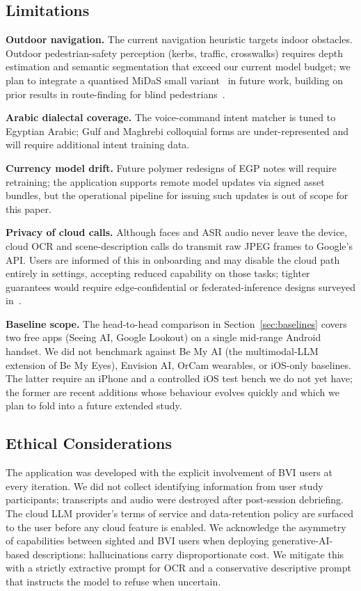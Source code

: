 \documentclass[11pt,a4paper]{article}
\begin{document}


\subsection{Limitations}

\textbf{Outdoor navigation.} The current navigation heuristic targets
indoor obstacles. Outdoor pedestrian-safety perception (kerbs, traffic,
crosswalks) requires depth estimation and semantic segmentation that
exceed our current model budget; we plan to integrate a quantised MiDaS
small variant~\cite{midas_depth} in future work, building on prior
results in route-finding for blind
pedestrians~\cite{hara_navigation}.

\textbf{Arabic dialectal coverage.} The voice-command intent matcher is
tuned to Egyptian Arabic; Gulf and Maghrebi colloquial forms are
under-represented and will require additional intent training data.

\textbf{Currency model drift.} Future polymer redesigns of EGP notes
will require retraining; the application supports remote model updates
via signed asset bundles, but the operational pipeline for issuing such
updates is out of scope for this paper.

\textbf{Privacy of cloud calls.} Although faces and ASR audio never
leave the device, cloud OCR and scene-description calls do transmit raw
JPEG frames to Google's API. Users are informed of this in onboarding
and may disable the cloud path entirely in settings, accepting reduced
capability on those tasks; tighter guarantees would require
edge-confidential or federated-inference designs surveyed
in~\cite{privacy_edge_ml}.

\textbf{Baseline scope.} The head-to-head comparison in
Section~\ref{sec:baselines} covers two free apps (Seeing AI, Google
Lookout) on a single mid-range Android handset. We did not benchmark
against Be My AI (the multimodal-LLM extension of Be My Eyes),
Envision AI, OrCam wearables, or iOS-only baselines. The latter
require an iPhone and a controlled iOS test bench we do not yet have;
the former are recent additions whose behaviour evolves quickly and
which we plan to fold into a future extended study.

\subsection{Ethical Considerations}

The application was developed with the explicit involvement of BVI users
at every iteration. We did not collect identifying information from user
study participants; transcripts and audio were destroyed after
post-session debriefing. The cloud LLM provider's terms of service and
data-retention policy are surfaced to the user before any cloud feature
is enabled. We acknowledge the asymmetry of capabilities between
sighted and BVI users when deploying generative-AI-based descriptions:
hallucinations carry disproportionate cost. We mitigate this with a
strictly extractive prompt for OCR and a conservative descriptive prompt
that instructs the model to refuse when uncertain.
\end{document}
